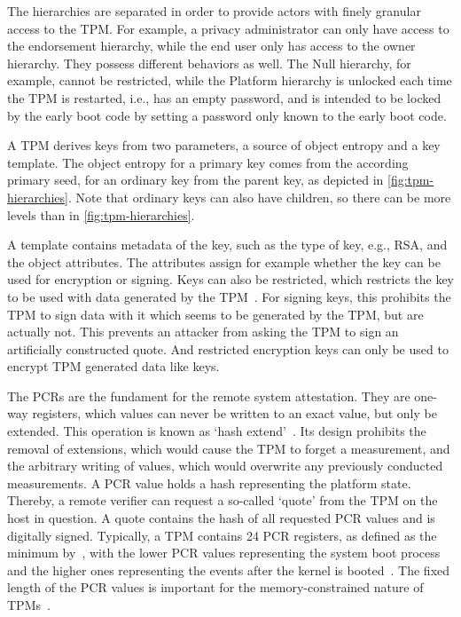 

The hierarchies are separated in order to provide actors with finely granular access to the TPM\@.
For example, a privacy administrator can only have access to the endorsement hierarchy, while the end user only has access to the owner hierarchy.
They possess different behaviors as well.
The Null hierarchy, for example, cannot be restricted, while the Platform hierarchy is unlocked each time the TPM is restarted, i.e., has an empty password, and is intended to be locked by the early boot code by setting a password only known to the early boot code.

A TPM derives keys from two parameters, a source of object entropy and a key template.
The object entropy for a primary key comes from the according primary seed, for an ordinary key from the parent key, as depicted in \autoref{fig:tpm-hierarchies}.
Note that ordinary keys can also have children, so there can be more levels than in \autoref{fig:tpm-hierarchies}.

A template contains metadata of the key, such as the type of key, e.g., RSA, and the object attributes.
The attributes assign for example whether the key can be used for encryption or signing.
Keys can also be restricted, which restricts the key to be used with data generated by the TPM~\cite{tpm}.
For signing keys, this prohibits the TPM to sign data with it which seems to be generated by the TPM, but are actually not.
This prevents an attacker from asking the TPM to sign an artificially constructed quote.
And restricted encryption keys can only be used to encrypt TPM generated data like keys.


The \acp{PCR} are the fundament for the remote system attestation. They are one-way registers, which values can never be written to an exact value, but only be extended.
This operation is known as `hash extend'~\cite{Arthur2015}.
Its design prohibits the removal of extensions, which would cause the TPM to forget a measurement, and the arbitrary writing of values, which would overwrite any previously conducted measurements.
A PCR value holds a hash representing the platform state.
Thereby, a remote verifier can request a so-called `quote' from the TPM on the host in question.
A quote contains the hash of all requested PCR values and is digitally signed.
Typically, a TPM contains 24 PCR registers, as defined as the minimum by~\cite{tcgPcClient}, with the lower PCR values representing the system boot process and the higher ones representing the events after the kernel is booted~\cite{Arthur2015}.
The fixed length of the \ac{PCR} values is important for the memory-constrained nature of TPMs~\cite{Arthur2015}.


